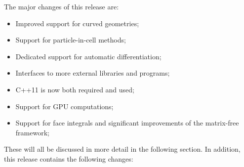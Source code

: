 \documentclass{ansarticle-preprint}
\begin{document}
The major changes of this release are:
\begin{itemize}
\item Improved support for curved geometries;
\item Support for particle-in-cell methods;
\item Dedicated support for automatic differentiation;
\item Interfaces to more external libraries and programs;
\item C++11 is now both required and used;
\item Support for GPU computations;
\item Support for face integrals and significant improvements of the matrix-free framework;
\end{itemize}
These will all be discussed in more detail in the
following section. In addition, this release contains the following changes:
\end{document}
